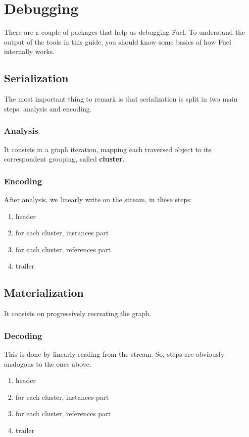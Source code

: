 \documentclass[a4paper,10pt,twoside]{book}
\begin{document}

\section{Debugging}

There are a couple of packages that help us debugging Fuel. To understand the output of the tools in this guide, you should know some basics of how Fuel internally works. 

\subsection{Serialization}
The most important thing to remark is that serialization is split in two main steps: analysis and encoding.

\subsubsection{Analysis}
It consists in a graph iteration, mapping each traversed object to its correspondent grouping, called \textbf{cluster}. 

\subsubsection{Encoding}
After analysis, we linearly write on the stream, in these steps:

\begin{enumerate}
\item header
\item for each cluster, instances part
\item for each cluster, references part
\item trailer
\end{enumerate}

\subsection{Materialization}
It consists on progressively recreating the graph.

\subsubsection{Decoding}
This is done by linearly reading from the stream. So, steps are obviously analogous to the ones above:

\begin{enumerate}
\item header
\item for each cluster, instances part
\item for each cluster, references part
\item trailer
\end{enumerate}
\end{document}

